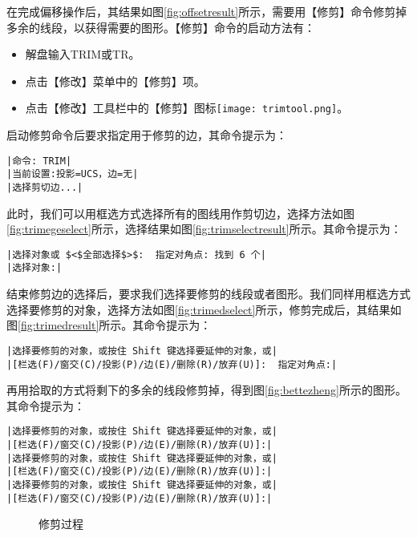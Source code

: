 \begin{procedure}
在完成偏移操作后，其结果如图\ref{fig:offsetresult}所示，需要用【修剪】命令修剪掉多余的线段，以获得需要的图形。【修剪】命令的启动方法有：
\begin{itemize}
\item 解盘输入TRIM或TR。
\item 点击【修改】菜单中的【修剪】项。
\item 点击【修改】工具栏中的【修剪】图标\texttt{[image: trimtool.png]}。
\end{itemize}
启动修剪命令后要求指定用于修剪的边，其命令提示为：
\begin{lstlisting}
|命令: TRIM|
|当前设置:投影=UCS，边=无|
|选择剪切边...|
\end{lstlisting}
此时，我们可以用框选方式选择所有的图线用作剪切边，选择方法如图\ref{fig:trimegeselect}所示，选择结果如图\ref{fig:trimselectresult}所示。其命令提示为：
\begin{lstlisting}
|选择对象或 $<$全部选择$>$:  指定对角点: 找到 6 个|
|选择对象:|
\end{lstlisting}
结束修剪边的选择后，要求我们选择要修剪的线段或者图形。我们同样用框选方式选择要修剪的对象，选择方法如图\ref{fig:trimedselect}所示，修剪完成后，其结果如图\ref{fig:trimedresult}所示。其命令提示为：
\begin{lstlisting}
|选择要修剪的对象，或按住 Shift 键选择要延伸的对象，或|
|[栏选(F)/窗交(C)/投影(P)/边(E)/删除(R)/放弃(U)]:  指定对角点:|
\end{lstlisting}
再用拾取的方式将剩下的多余的线段修剪掉，得到图\ref{fig:bettezheng}所示的图形。其命令提示为：
\begin{lstlisting}
|选择要修剪的对象，或按住 Shift 键选择要延伸的对象，或|
|[栏选(F)/窗交(C)/投影(P)/边(E)/删除(R)/放弃(U)]:|
|选择要修剪的对象，或按住 Shift 键选择要延伸的对象，或|
|[栏选(F)/窗交(C)/投影(P)/边(E)/删除(R)/放弃(U)]:|
|选择要修剪的对象，或按住 Shift 键选择要延伸的对象，或|
|[栏选(F)/窗交(C)/投影(P)/边(E)/删除(R)/放弃(U)]:|
\end{lstlisting}
\begin{figure}[htbp]
\hspace{20pt}
\hspace{20pt}
\hspace{20pt}
\caption{修剪过程}
\end{figure}
\end{procedure}

